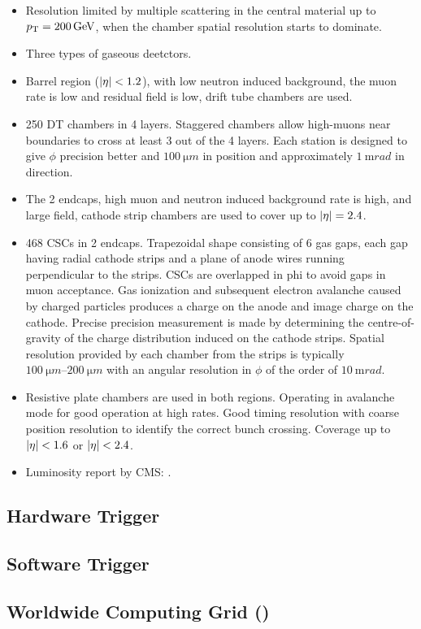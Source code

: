 \begin{itemize}
    \item Resolution limited by multiple scattering in the central material
        up to $p_{\text{T}}=\SI{200}{GeV}$, when the chamber spatial resolution starts
        to dominate.
    \item Three types of gaseous deetctors.
    \item Barrel region (${|\eta|<1.2}$), with low neutron induced background,
        the muon rate is low and residual field is low, drift tube chambers are
        used.
    \item 250 DT chambers in 4 layers. Staggered chambers allow high-\pt muons
        near boundaries to cross at least 3 out of the 4 layers. Each station is
        designed to give $\phi$ precision better and ${\SI{100}{\micro m}}$ in
        position and approximately ${\SI{1}{\milli rad}}$ in direction.
    \item The 2 endcaps, high muon and neutron induced background rate is high,
        and large field, cathode strip chambers are used to cover up to
        ${{|\eta|}=2.4}$.
    \item 468 CSCs in 2 endcaps. Trapezoidal shape consisting of 6 gas gaps,
        each gap having radial cathode strips and a plane of anode wires running
        perpendicular to the strips. CSCs are overlapped in phi to avoid gaps
        in muon acceptance. Gas ionization and subsequent electron avalanche
        caused by charged particles produces a charge on the anode and image
        charge on the cathode. Precise precision measurement is made by
        determining the centre-of-gravity of the charge distribution induced on
        the cathode strips. Spatial resolution provided by each chamber from the
        strips is typically ${\SIrange{100}{200}{\micro m}}$ with an angular
        resolution in $\phi$ of the order of ${\SI{10}{\milli rad}}$.
    \item Resistive plate chambers are used in both regions. Operating
        in avalanche mode for good operation at high rates. Good timing
        resolution with coarse position resolution to identify the correct
        bunch crossing. Coverage up to ${|\eta|<1.6}$ or ${|\eta|<2.4}$.
    \item Luminosity report by CMS: \cite{CMS-PAS-LUM-17-001}.
\end{itemize}

\subsection{Hardware Trigger}

\subsection{Software Trigger}

\subsection{Worldwide \LHC Computing Grid (\WLCG)}

